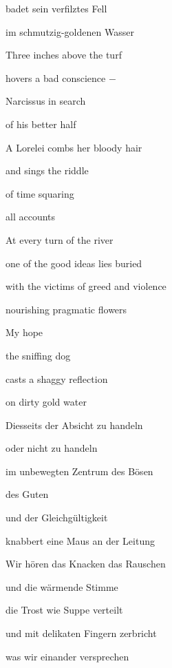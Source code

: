 badet sein verfilztes Fell

im schmutzig-goldenen Wasser


\bigskip


\bigskip



\bigskip

Three inches above the turf

hovers a bad conscience $-$

Narcissus in search

of his better half


\bigskip

A Lorelei combs her bloody hair

and sings the riddle

of time squaring 

all accounts


\bigskip

At every turn of the river

one of the good ideas lies buried

with the victims of greed and violence

nourishing pragmatic flowers


\bigskip

My hope

the sniffing dog

casts a shaggy reflection 

on dirty gold water


\bigskip


\bigskip


\bigskip



\bigskip

Diesseits der Absicht zu handeln

oder nicht zu handeln

im unbewegten Zentrum des Bösen

des Guten

und der Gleichgültigkeit


\bigskip

knabbert eine Maus an der Leitung

Wir hören das Knacken das Rauschen

und die wärmende Stimme

die Trost wie Suppe verteilt

und mit delikaten Fingern zerbricht

was wir einander versprechen


